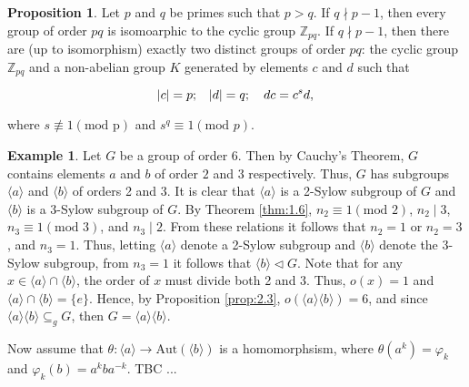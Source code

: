 \documentclass{article}
\makeatletter
\theoremstyle{definition}
\newtheorem{prop}{Proposition}[section]
\theoremstyle{remark}
\let\oldproofname=\proofname
\renewcommand{\proofname}{\bf{\textit{\oldproofname}}}
\theoremstyle{definition}
\newtheorem{example}{Example}[section]
\renewenvironment{proof}[1][\proofname]{\par
  \pushQED{\qed}%
  \normalfont \topsep6\p@\@plus6\p@\relax
  \list{}{\leftmargin=0mm
          \rightmargin=0mm
          \settowidth{\itemindent}{\itshape#1}%
          \labelwidth=4mm
          \parsep=0pt \listparindent=0mm%
  }
  \item[\hskip\labelsep
        \itshape
    #1\@addpunct{.}]\ignorespaces
}{%
  \popQED\endlist\@endpefalse
}
\makeatother
\begin{document}
    \begin{prop}\label{prop:2.7}
        Let $p$ and $q$ be primes such that $p>q$. If $q\nmid p-1$, then every group of order $pq$ is isomoarphic to the cyclic group $\mathbb{Z}_{pq}$. If $q\nmid p-1$, then there are (up to isomorphism) exactly two distinct groups of order $pq$: the cyclic group $\mathbb{Z}_{pq}$ and a non-abelian group $K$ generated by elements $c$ and $d$ such that 
        
        \begin{equation*}
            \abs{c}=p;\quad\abs{d}=q;\quad dc=c^sd,
        \end{equation*}
        
        \noindent where $s\not\equiv 1(\text{mod p})$ and $s^q\equiv 1(\text{mod }p)$.
    \end{prop}
        \begin{proof}
        
        \end{proof}
        
    \newpage
    
    
    \begin{example}
        Let $G$ be a group of order 6. Then by Cauchy's Theorem, $G$ contains elements $a$ and $b$ of order $2$ and $3$ respectively. Thus, $G$ has subgroups $\langle a\rangle$ and $\langle b\rangle$ of orders 2 and 3. It is clear that $\langle a\rangle$ is a 2-Sylow subgroup of $G$ and $\langle b\rangle$ is a 3-Sylow subgroup of $G$. By Theorem \ref{thm:1.6}, $n_2\equiv 1(\text{mod }2)$, $n_2\mid 3$, $n_3\equiv 1(\text{mod }3)$, and $n_3\mid 2$. From these relations it follows that $n_2=1$ or $n_2=3$, and $n_3=1$. Thus, letting $\langle a\rangle $ denote a 2-Sylow subgroup and $\langle b\rangle$ denote the 3-Sylow subgroup, from $n_3=1$ it follows that $\langle b\rangle\triangleleft G$. Note that for any $x\in\langle a\rangle\cap\langle b\rangle$, the order of $x$ must divide both 2 and 3. Thus, $o(x)=1$ and $\langle a\rangle\cap\langle b\rangle=\{e\}$. Hence, by Proposition \ref{prop:2.3}, $o(\langle a\rangle\langle b\rangle)=6$, and since $\langle a\rangle\langle b\rangle\subseteq_g G$, then $G=\langle a\rangle\langle b\rangle$.\par\hspace{4mm} Now assume that $\theta\colon \langle a\rangle\rightarrow\text{Aut}(\langle b\rangle)$ is a homomorphsism, where $\theta(a^k)=\varphi_k$ and $\varphi_k(b)=a^kba^{-k}$. TBC ...
    \end{example}
    
    \newpage
              
\end{document}
